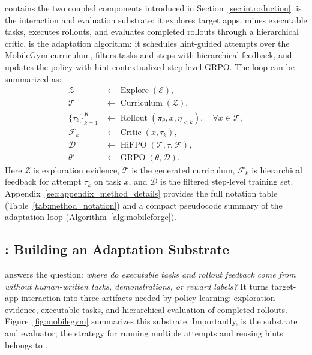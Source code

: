 \ourmethod contains the two coupled components introduced in Section~\ref{sec:introduction}. \mobilegym is the interaction and evaluation substrate: it explores target apps, mines executable tasks, executes rollouts, and evaluates completed rollouts through a hierarchical critic. \hifpo is the adaptation algorithm: it schedules hint-guided attempts over the MobileGym curriculum, filters tasks and steps with hierarchical feedback, and updates the policy with hint-contextualized step-level GRPO. The loop can be summarized as:
\begin{equation}
\label{eq:mobileforge-loop}
\begin{aligned}
\mathcal{Z} &\leftarrow \operatorname{Explore}(\mathcal{E}),\\
\mathcal{T} &\leftarrow \operatorname{Curriculum}(\mathcal{Z}),\\
\{\tau_k\}_{k=1}^{K} &\leftarrow
\operatorname{Rollout}(\pi_\theta,x,\eta_{<k}),\quad \forall x\in\mathcal{T},\\
\mathcal{F}_{k} &\leftarrow \operatorname{Critic}(x,\tau_k),\\
\mathcal{D} &\leftarrow \operatorname{HiFPO}(\mathcal{T},\tau,\mathcal{F}),\\
\theta' &\leftarrow \operatorname{GRPO}(\theta,\mathcal{D}).
\end{aligned}
\end{equation}
Here $\mathcal{Z}$ is exploration evidence, $\mathcal{T}$ is the generated curriculum, $\mathcal{F}_{k}$ is hierarchical feedback for attempt $\tau_k$ on task $x$, and $\mathcal{D}$ is the filtered step-level training set. Appendix~\ref{sec:appendix_method_details} provides the full notation table (Table~\ref{tab:method_notation}) and a compact pseudocode summary of the adaptation loop (Algorithm~\ref{alg:mobileforge}).

\subsection{\mobilegym: Building an Adaptation Substrate}
\label{sec:mobilegym}

\mobilegym answers the question: \emph{where do executable tasks and rollout feedback come from without human-written tasks, demonstrations, or reward labels?} It turns target-app interaction into three artifacts needed by policy learning: exploration evidence, executable tasks, and hierarchical evaluation of completed rollouts. Figure~\ref{fig:mobilegym} summarizes this substrate. Importantly, \mobilegym is the substrate and evaluator; the strategy for running multiple attempts and reusing hints belongs to \hifpo.

